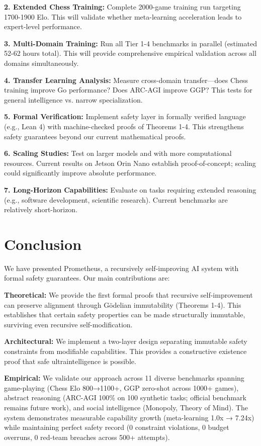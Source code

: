 \documentclass[11pt,letterpaper]{article}
\begin{document}
\textbf{2. Extended Chess Training:} Complete 2000-game training run targeting 1700-1900 Elo. This will validate whether meta-learning acceleration leads to expert-level performance.

\textbf{3. Multi-Domain Training:} Run all Tier 1-4 benchmarks in parallel (estimated 52-62 hours total). This will provide comprehensive empirical validation across all domains simultaneously.

\textbf{4. Transfer Learning Analysis:} Measure cross-domain transfer—does Chess training improve Go performance? Does ARC-AGI improve GGP? This tests for general intelligence vs. narrow specialization.

\textbf{5. Formal Verification:} Implement safety layer in formally verified language (e.g., Lean 4) with machine-checked proofs of Theorems 1-4. This strengthens safety guarantees beyond our current mathematical proofs.

\textbf{6. Scaling Studies:} Test on larger models and with more computational resources. Current results on Jetson Orin Nano establish proof-of-concept; scaling could significantly improve absolute performance.

\textbf{7. Long-Horizon Capabilities:} Evaluate on tasks requiring extended reasoning (e.g., software development, scientific research). Current benchmarks are relatively short-horizon.

\section{Conclusion}

We have presented Prometheus, a recursively self-improving AI system with formal safety guarantees. Our main contributions are:

\textbf{Theoretical:} We provide the first formal proofs that recursive self-improvement can preserve alignment through Gödelian immutability (Theorems 1-4). This establishes that certain safety properties can be made structurally immutable, surviving even recursive self-modification.

\textbf{Architectural:} We implement a two-layer design separating immutable safety constraints from modifiable capabilities. This provides a constructive existence proof that safe ultraintelligence is possible.

\textbf{Empirical:} We validate our approach across 11 diverse benchmarks spanning game-playing (Chess Elo 800→1100+, GGP zero-shot across 1000+ games), abstract reasoning (ARC-AGI 100\% on 100 synthetic tasks; official benchmark remains future work), and social intelligence (Monopoly, Theory of Mind). The system demonstrates measurable capability growth (meta-learning 1.0x → 7.24x) while maintaining perfect safety record (0 constraint violations, 0 budget overruns, 0 red-team breaches across 500+ attempts).
\end{document}

